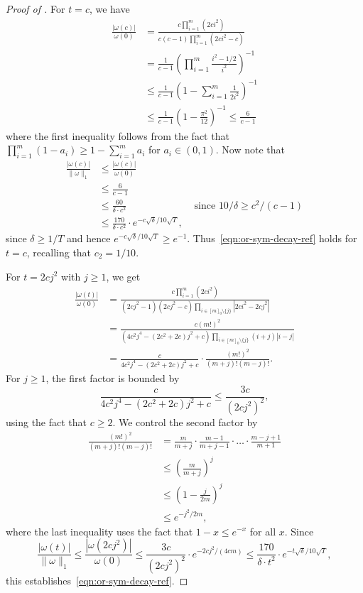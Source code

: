 \documentclass[11pt, letterpaper, fleqn]{article}
\theoremstyle{plain}
\begin{document}
\begin{proof}[Proof of ]
For $t = c$, we have
\begin{align} \label{eqn:omega-2}
\frac{|\omega(c)|}{\omega(0)} &= \frac{c\prod_{i = 1}^m (2ci^2)}{c(c-1)\prod_{i = 1}^m (2ci^2 - c)} \nonumber \\
&= \frac{1}{c-1}\left(\prod_{i = 1}^m \frac{i^2 - 1/2}{i^2}\right)^{-1} \nonumber \\
&\le \frac{1}{c-1} \left(1 - \sum_{i=1}^m \frac{1}{2i^2}\right)^{-1} \nonumber \\
&\le \frac{1}{c-1} \left(1 - \frac{\pi^2}{12}\right)^{-1} \le \frac{6}{c - 1}
\end{align}
where the first inequality follows from the fact that $\prod_{i = 1}^m (1 - a_i) \ge 1 - \sum_{i = 1}^m a_i$ for $a_i \in (0, 1)$. Now note that
\begin{align*}
\frac{|\omega(c)|}{\|\omega\|_1} &\le \frac{|\omega(c)|}{\omega(0)} \\
&\le \frac{6}{c - 1} \\
&\le \frac{60}{\delta \cdot c^2} & \text{ since } 10/\delta \ge c^2 / (c-1) \\
& \le \frac{170}{\delta \cdot c^2} \cdot e^{-c\sqrt{\delta}/10\sqrt{T}},
\end{align*}
since $\delta \ge 1/T$ and hence $e^{-c\sqrt{\delta}/10\sqrt{T}} \ge e^{-1}$. Thus~\eqref{eqn:or-sym-decay-ref} holds for $t = c$, recalling that $c_2 = 1/10$.

For $t = 2cj^2$ with $j \ge 1$, we get
\begin{align*}
\frac{|\omega(t)|}{\omega(0)} &= \frac{c\prod_{i = 1}^m (2ci^2)}{(2cj^2 - 1)(2cj^2-c)\prod_{i \in [m]_0 \setminus \{j\}} |2ci^2 - 2cj^2|} \\
&= \frac{c(m!)^2}{(4c^2j^4 - (2c^2 + 2c)j^2 + c)\prod_{i \in [m]_0 \setminus \{j\}} (i+j)|i-j|} \\
&= \frac{c}{4c^2j^4 - (2c^2 + 2c)j^2 + c} \cdot \frac{(m!)^2}{(m+j)!(m-j)!}.
\end{align*}
For $j \ge 1$, the first factor is bounded by
\[\frac{c}{4c^2j^4 - (2c^2 + 2c)j^2 + c} \le \frac{3c}{(2cj^2)^2},\]
using the fact that $c \ge 2$. We control the second factor by
\begin{align*}
\frac{(m!)^2}{(m+j)!(m-j)!} &= \frac{m}{m+j} \cdot \frac{m-1}{m+j-1} \cdot \ldots \cdot \frac{m-j+1}{m+1} \\
&\le \left(\frac{m}{m+j} \right)^j \\
&\le  \left(1 - \frac{j}{2m} \right)^j \\
&\le e^{-j^2/2m},
\end{align*}
where the last inequality uses the fact that $1 - x \le e^{-x}$ for all $x$.
Since
\[\frac{|\omega(t)|}{\|\omega\|_1} \le \frac{|\omega(2cj^2)|}{\omega(0)} \le \frac{3c}{(2cj^2)^2} \cdot e^{-2cj^2/(4cm)} \le \frac{170}{\delta \cdot t^2} \cdot e^{-t \sqrt{\delta} / 10 \sqrt{T}},\]
this establishes~\eqref{eqn:or-sym-decay-ref}.



\end{proof}
\end{document}
